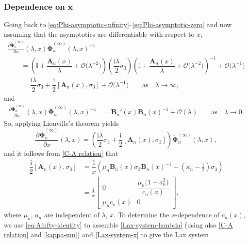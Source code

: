\documentclass[pdftex]{sigma}
\numberwithin{equation}{section}
\newcommand{\ii}{\mathrm{i}}
\newcommand{\para}[1]{\breve{#1}}
\begin{document}
\subsubsection[Dependence on x]{Dependence on $\boldsymbol{x}$}
Going back to \eqref{eq:Phi-asymptotic-infinity}--\eqref{eq:Phi-asymptotic-zero} and now assuming that the asymptotics are differentiable with respect to $x$,
\begin{gather*}
 \frac{\partial\para{\boldsymbol \Phi}^{(\infty)}_n}{\partial x}(\lambda,x) \para{\boldsymbol \Phi}_n^{(\infty)} (\lambda,x)^{-1}\\
 \qquad= \left(\mathbb I + \dfrac{\mathbf{A}_{n}(x)}{\lambda} + \mathcal{O}\big( \lambda^{-2}\big) \right) \left( \dfrac{\ii \lambda}{2}\sigma_3 \right)\left(\mathbb I + \dfrac{\mathbf{A}_{n}(x)}{\lambda} + \mathcal{O}\big( \lambda^{-2}\big)\right)^{-1} + \mathcal{O}\big( \lambda^{-1} \big)\\
 \qquad = \dfrac{\ii \lambda}{2} \sigma_3 + \dfrac{\ii}{2} [\mathbf{A}_{n}(x), \sigma_3] + \mathcal{O}\big( \lambda^{-1} \big) \qquad \text{as} \quad \lambda \to \infty,
\end{gather*}
and
\begin{align*}
 \frac{\partial\para{\boldsymbol \Phi}^{(\infty)}_n}{\partial x}(\lambda,x) \para{\boldsymbol \Phi}_n^{(\infty)}(\lambda,x)^{-1} &= \mathbf{B}_n'(x) \mathbf{B}_n(x)^{-1} + \mathcal{O}(\lambda) \qquad \text{as} \quad \lambda \to 0.
\end{align*}
So, applying Liouville's theorem yields
\begin{equation}
 \frac{\partial\para{\boldsymbol \Phi}^{(\infty)}_{n}}{\partial x} (\lambda,x) = \left( \dfrac{\ii \lambda}{2} \sigma_3 + \dfrac{\ii}{2} [\mathbf{A}_n(x), \sigma_3] \right) \para{\boldsymbol \Phi}_n^{(\infty)}(\lambda,x),
 \label{Lax-system-x}
\end{equation}
and it follows from \eqref{C-A relation} that
\begin{align}
\dfrac{\ii}{2}[\mathbf{A}_n(x), \sigma_3] &= \dfrac{1}{x} \left( \mu_n\mathbf{B}_n(x) \sigma_3 \mathbf{B}_n(x)^{-1} +\left(\kappa_n-\frac{1}{2}\right) \sigma_3 \right)\nonumber\\
& = \frac{1}{x}\begin{bmatrix} 0 & \dfrac{\mu_n\big(1 - a_n^2\big)}{c_n(x)} \\ \mu_n c_n(x) & 0 \end{bmatrix},
\label{eq:Ainfty-identity}
\end{align}
where $\mu_n$, $a_n$ are independent of $\lambda$, $x$. To determine the $x$-dependence of $c_n(x)$, we use \eqref{eq:Ainfty-identity} to assemble \eqref{Lax-system-lambda} (using also \eqref{C-A relation} and \eqref{kappa-mu}) and \eqref{Lax-system-x} to give the Lax system
\end{document}
